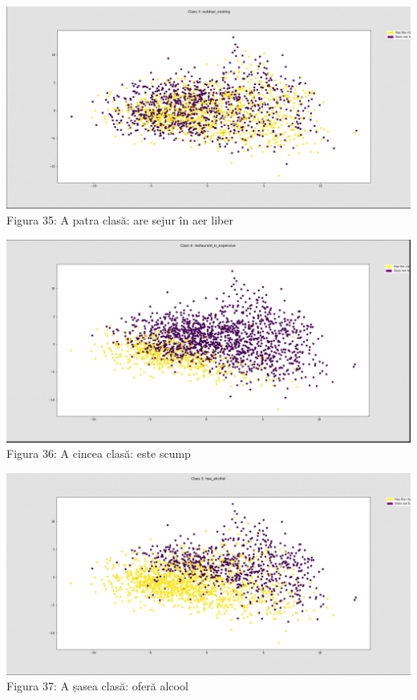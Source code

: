 \begin{center}
\includegraphics[scale=0.4]{class3} \\
Figura 35: A patra clasă: are sejur în aer liber \\
\hfill \break

\includegraphics[scale=0.4]{class4} \\
Figura 36: A cincea clasă: este scump \\
\hfill \break

\includegraphics[scale=0.4]{class5} \\
Figura 37: A șasea clasă: oferă alcool \\
\hfill \break


\end{center}
